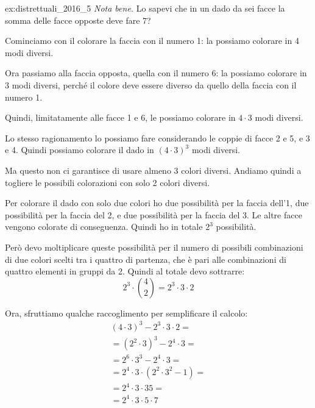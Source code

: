 \begin{soluzione}{ex:distrettuali_2016_5}
    \emph{Nota bene.} Lo sapevi che in un dado da sei facce la somma delle facce opposte deve fare 7?

    Cominciamo con il colorare la faccia con il numero 1: la possiamo colorare in 4 modi diversi.

    Ora passiamo alla faccia opposta, quella con il numero 6: la possiamo colorare in 3 modi diversi, perché il colore
    deve essere diverso da quello della faccia con il numero 1.

    Quindi, limitatamente alle facce 1 e 6, le possiamo colorare in $4 \cdot 3$ modi diversi.

    Lo stesso ragionamento lo possiamo fare considerando le coppie di facce 2 e 5, e 3 e 4.
    Quindi possiamo colorare il dado in $(4 \cdot 3)^3$ modi diversi.

    Ma questo non ci garantisce di usare almeno 3 colori diversi.
    Andiamo quindi a togliere le possibili colorazioni con solo 2 colori diversi.

    Per colorare il dado con solo due colori ho due possibilità per la faccia dell'1, due possibilità per la faccia del
    2, e due possibilità per la faccia del 3.
    Le altre facce vengono colorate di conseguenza.
    Quindi ho in totale $2^3$ possibilità.

    Però devo moltiplicare queste possibilità per il numero di possibili combinazioni di due colori scelti tra i quattro
    di partenza, che è pari alle combinazioni di quattro elementi in gruppi da 2.
    Quindi al totale devo sottrarre:
    \begin{equation*}
        2^3 \cdot \binom{4}{2} = 2^3 \cdot 3 \cdot 2
    \end{equation*}

    Ora, sfruttiamo qualche raccoglimento per semplificare il calcolo:
    \begin{gather*}
        (4 \cdot 3)^3 - 2^3 \cdot 3 \cdot 2 = \\
        = (2^2 \cdot 3)^3 - 2^4 \cdot 3 = \\
        = 2^6 \cdot 3^3 - 2^4 \cdot 3 = \\
        = 2^4 \cdot 3 \cdot (2^2 \cdot 3^2 - 1) = \\
        = 2^4 \cdot 3 \cdot 35 = \\
        = 2^4 \cdot 3 \cdot 5 \cdot 7
    \end{gather*}
\end{soluzione}